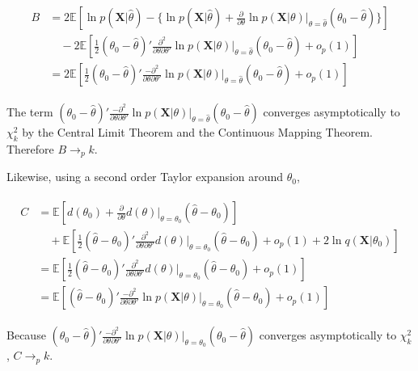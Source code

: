 \documentclass[11pt]{article}
\begin{document}
\begin{align}
\begin{split}
B &= 2 \mathbb{E} \left[ \ln{p(\mathbf{X} \vert \hat{\theta})} - 
\{ 
\ln{p(\mathbf{X} \vert \hat{\theta})} 
+ \frac{\partial}{\partial \theta} \ln{p(\mathbf{X} \vert \theta)} \vert_{\theta=\hat{\theta}} (\theta_0 - \hat{\theta}) \} \right]  \\
& \quad - 2\mathbb{E} \left[ \frac{1}{2}(\theta_0 - \hat{\theta})' \frac{\partial^2}{\partial\theta\partial\theta'}\ln{p(\mathbf{X} \vert \theta)} \vert_{\theta=\hat{\theta}}(\theta_0 - \hat{\theta}) + o_p(1) \right] \\
&= 2\mathbb{E} \left[ \frac{1}{2}(\theta_0 - \hat{\theta})' \frac{-\partial^2}{\partial\theta\partial\theta'}\ln{p(\mathbf{X} \vert \theta)} \vert_{\theta=\hat{\theta}}(\theta_0 - \hat{\theta}) + o_p(1) \right]
\end{split}
\end{align}

The term $(\theta_0 - \hat{\theta})' \frac{-\partial^2}{\partial\theta\partial\theta'}\ln{p(\mathbf{X} \vert \theta)} \vert_{\theta=\hat{\theta}}(\theta_0 - \hat{\theta})$ converges asymptotically to $\chi^2_k$ by the Central Limit Theorem and the Continuous Mapping Theorem. Therefore $B \rightarrow_p k$.

Likewise, using a second order Taylor expansion around $\theta_0$,

\begin{align}
\begin{split}
C &= \mathbb{E} \left[ d(\theta_0) + \frac{\partial}{\partial\theta}d(\theta) \vert_{\theta=\theta_0}(\hat{\theta} - \theta_0) \right] \\
& \quad + \mathbb{E} \left[ \frac{1}{2}(\hat{\theta} - \theta_0)' \frac{\partial^2}{\partial \theta \partial \theta'}d(\theta) \vert_{\theta=\theta_0}(\hat{\theta} - \theta_0) + o_p(1) + 2\ln{q(\mathbf{X} \vert \theta_0)} \right] \\
&= \mathbb{E} \left[ \frac{1}{2}(\hat{\theta} - \theta_0)' \frac{\partial^2}{\partial \theta \partial \theta'}d(\theta) \vert_{\theta=\theta_0}(\hat{\theta} - \theta_0) + o_p(1) \right] \\
&= \mathbb{E} \left[ (\hat{\theta} - \theta_0)'\frac{-\partial^2}{\partial\theta\partial\theta'}\ln{p(\mathbf{X} \vert \theta)} \vert_{\theta=\theta_0}(\hat{\theta} - \theta_0) + o_p(1) \right]
\end{split}
\end{align}

Because $(\theta_0 - \hat{\theta})' \frac{-\partial^2}{\partial\theta\partial\theta'}\ln{p(\mathbf{X} \vert \theta)} \vert_{\theta=\theta_0}(\theta_0 - \hat{\theta})$ converges asymptotically to $\chi^2_k$, $C \rightarrow_p k$.
\end{document}
